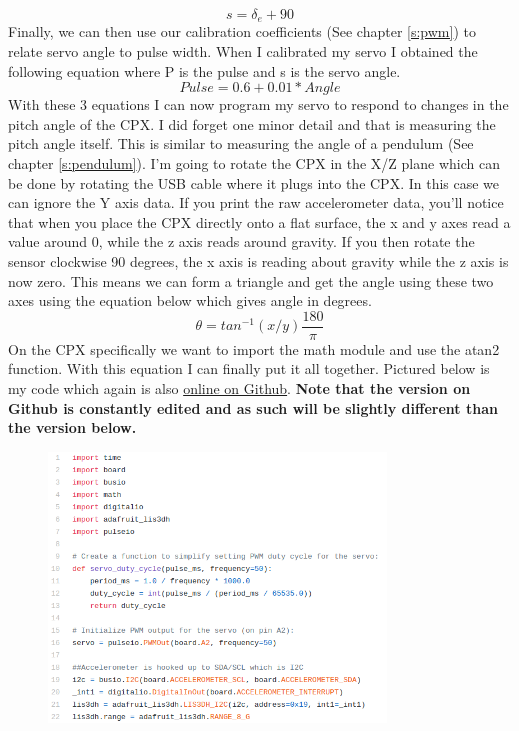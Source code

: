 \begin{equation}
s = \delta_e + 90
\end{equation}
Finally, we can then use our calibration coefficients (See chapter \ref{s:pwm}) to relate servo angle to pulse width. When I calibrated my servo I obtained the following equation where P is the pulse and s is the servo angle.
\begin{equation}
Pulse = 0.6 + 0.01*Angle
\end{equation}
With these 3 equations I can now program my servo to respond to changes in the pitch angle of the CPX. I did forget one minor detail and that is measuring the pitch angle itself. This is similar to measuring the angle of a pendulum (See chapter \ref{s:pendulum}). I’m going to rotate the CPX in the X/Z plane which can be done by rotating the USB cable where it plugs into the CPX. In this case we can ignore the Y axis data. If you print the raw accelerometer data, you’ll notice that when you place the CPX directly onto a flat surface, the x and y axes read a value around 0, while the z axis reads around gravity. If you then rotate the sensor clockwise 90 degrees, the x axis is reading about gravity while the z axis is now zero. This means we can form a triangle and get the angle using these two axes using the equation below which gives angle in degrees.
\begin{equation}
\theta = tan^{-1}(x/y)\frac{180}{\pi}
\end{equation}
On the CPX specifically we want to import the math module and use the atan2 function. With this equation I can finally put it all together. Pictured below is my code which again is also \href{https://github.com/cmontalvo251/Microcontrollers/blob/master/Circuit_Playground/CircuitPython/Servo/feedback_control_servo.py}{online on Github}. {\bf Note that the version on Github is constantly edited and as such will be slightly different than the version below.}
\begin{figure}[H]
  \begin{center}
    \includegraphics[width=0.8\textwidth]{Figures/feedback1.png}
  \end{center}
\end{figure}
